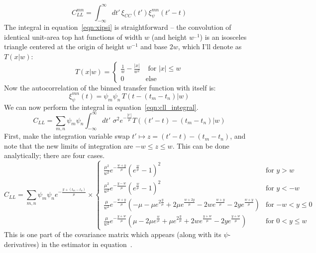 \documentclass[11pt,a4paper]{article}
\begin{document}
\begin{equation}
C_{LL}^{mn}=\int_{-\infty}^{\infty}dt'\,\xi_{CC}(t')\xi_{\psi}^{mn}(t'-t)
\label{eqn:cll_integral}
\end{equation}
The integral in equation~\ref{eqn:xipsi} is straightforward -- the
convolution of identical unit-area top hat functions of width $w$ (and
height $w^{_-1}$) is an isosceles triangle centered at the origin of
height $w^{-1}$ and base $2w$, which I'll denote as $T(x|w)$:
\begin{equation}
T(x|w)= \begin{cases}
  \frac{1}{w}-\frac{|x|}{w^2} & \text{ for $|x| \le w $} \\
  0 & \text{else}
\end{cases}
\end{equation}
Now the autocorrelation of the binned transfer function with itself
is:
\begin{equation}
  \xi_{\psi}^{mn}(t)= \psi_m\psi_n\,T(t-(t_m-t_n)|w)
\end{equation}
We can now perform the integral in equation~\ref{eqn:cll_integral}.
\begin{equation}
C_{LL} = \sum\limits_{m,n}\psi_m\psi_n\int_{-\infty}^{\infty}dt'\,\,\sigma^2e^{-\frac{|t'|}{\mu}}T((t'-t)-(t_m-t_n)|w)
\end{equation}
First, make the integration variable swap $t'\mapsto z =
(t'-t)-(t_m-t_n)$, and note that the new limits of integration are $-w
\le z \le w$. This can be done analytically; there are four cases.
\begin{equation}
  C_{LL}=
  \sum\limits_{m,n}\psi_m\psi_ne^{-\frac{|t+(t_m-t_n)}{\mu}}\times  
  \begin{cases}
    \frac{\mu^2}{w^2}e^{-\frac{w+y}{\mu}}\left(e^{\frac{w}{\mu}}-1\right)^2
    & \text{for $y > w$} \\
    \frac{\mu^2}{w^2}e^{-\frac{y-w}{\mu}}\left(e^{\frac{w}{\mu}}-1\right)^2
    & \text{for $y < -w$} \\
    \frac{\mu}{w^2}e^{-\frac{w+y}{\mu}}\left(-\mu -
      \mu e^{2\frac{y}{\mu}}+2\mu e^{\frac{w+2y}{\mu}}-2w
      e^{\frac{w+y}{\mu}} - 2ye^{\frac{w+y}{\mu}}\right) & \text{for
      $-w < y \leq 0$} \\
    \frac{\mu}{w^2}e^{-\frac{y+w}{\mu}}\left( \mu - 2\mu
      e^{\frac{w}{\mu}} +\mu e^{2\frac{y}{\mu}} + 2w
      e^{\frac{y+w}{\mu}} - 2y e^{\frac{y+w}{\mu}} \right) & \text{for
      $0 < y \leq w$}
  \end{cases}
\end{equation}
This is one part of the covariance matrix which appears (along with
its $\psi$-derivatives) in the estimator in
equation~\label{eqn:estimator}.
\end{document}
